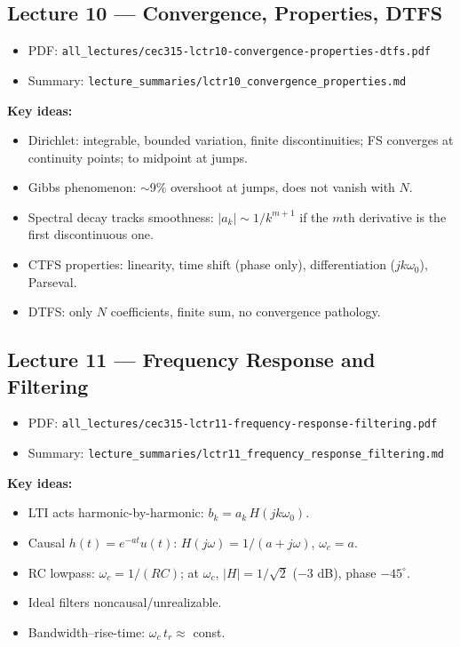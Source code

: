\documentclass[11pt]{article}
\begin{document}
\subsection{Lecture 10 --- Convergence, Properties, DTFS}
\begin{itemize}[leftmargin=*]
  \item PDF: \texttt{all\_lectures/cec315-lctr10-convergence-properties-dtfs.pdf}
  \item Summary: \texttt{lecture\_summaries/lctr10\_convergence\_properties.md}
\end{itemize}
\textbf{Key ideas:}
\begin{itemize}[leftmargin=*]
  \item Dirichlet: integrable, bounded variation, finite discontinuities; FS converges at continuity points; to midpoint at jumps.
  \item Gibbs phenomenon: $\sim$9\% overshoot at jumps, does not vanish with $N$.
  \item Spectral decay tracks smoothness: $|a_k|\sim 1/k^{m+1}$ if the $m$th derivative is the first discontinuous one.
  \item CTFS properties: linearity, time shift (phase only), differentiation ($jk\omega_0$), Parseval.
  \item DTFS: only $N$ coefficients, finite sum, no convergence pathology.
\end{itemize}

\subsection{Lecture 11 --- Frequency Response and Filtering}
\begin{itemize}[leftmargin=*]
  \item PDF: \texttt{all\_lectures/cec315-lctr11-frequency-response-filtering.pdf}
  \item Summary: \texttt{lecture\_summaries/lctr11\_frequency\_response\_filtering.md}
\end{itemize}
\textbf{Key ideas:}
\begin{itemize}[leftmargin=*]
  \item LTI acts harmonic-by-harmonic: $b_k = a_k\, H(jk\omega_0)$.
  \item Causal $h(t)=e^{-at}u(t)$: $H(j\omega)=1/(a+j\omega)$, $\omega_c = a$.
  \item RC lowpass: $\omega_c = 1/(RC)$; at $\omega_c$, $|H|=1/\sqrt{2}$ ($-3$ dB), phase $-45^\circ$.
  \item Ideal filters noncausal/unrealizable.
  \item Bandwidth--rise-time: $\omega_c\, t_r\approx$ const.
\end{itemize}
\end{document}
